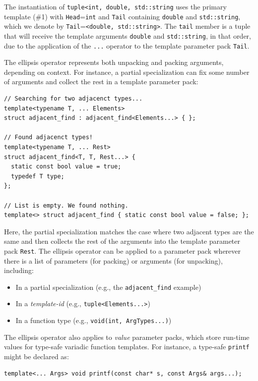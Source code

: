 \documentclass{article}
\begin{document}
The instantiation of \texttt{tuple<int, double, std::string} uses the
primary template (\#1) with \texttt{Head}=\texttt{int} and
\texttt{Tail} containing \texttt{double} and \texttt{std::string},
which we denote by \texttt{Tail}=\texttt{<double, std::string>}. The
\texttt{tail} member is a tuple that will receive the template arguments
\texttt{double} and \texttt{std::string}, in that order, due to the
application of the \texttt{...} operator to the template parameter
pack \texttt{Tail}. 

The ellipsis operator represents both unpacking and packing arguments,
depending on context. For instance, a partial specialization can fix
some number of arguments and collect the rest in a template parameter
pack:

\begin{verbatim}
// Searching for two adjacenct types...
template<typename T, ... Elements> 
struct adjacent_find : adjacent_find<Elements...> { };

// Found adjacenct types!
template<typename T, ... Rest>
struct adjacent_find<T, T, Rest...> {
  static const bool value = true; 
  typedef T type;
};

// List is empty. We found nothing.
template<> struct adjacent_find { static const bool value = false; };
\end{verbatim}

Here, the partial specialization matches the case where two adjacent
types are the same and then collects the rest of the arguments into
the template parameter pack \texttt{Rest}. The ellipsis operator can
be applied to a parameter pack wherever there is a list of parameters
(for packing) or arguments (for unpacking), including:
\begin{itemize}
  \item In a partial specialization (e.g., the \texttt{adjacent\_find} example)
  \item In a \textit{template-id} (e.g., \texttt{tuple<Elements...>})
  \item In a function type (e.g., \texttt{void(int, ArgTypes...)})
\end{itemize}

The ellipsis operator also applies to \textit{value} parameter packs,
which store run-time values for type-safe variadic function
templates. For instance, a type-safe \texttt{printf} might be declared
as:

\begin{verbatim}
template<... Args> void printf(const char* s, const Args& args...);
\end{verbatim}
\end{document}
